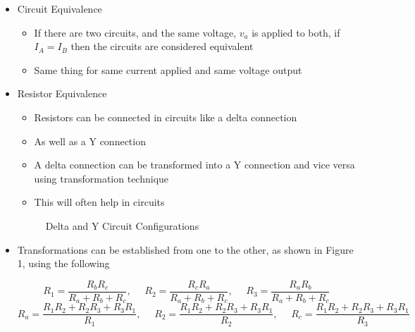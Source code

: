 \begin{itemize}

  \item Circuit Equivalence

    \begin{itemize}

      \item If there are two circuits, and the same voltage, $v_a$ is applied to both, if $I_A=I_B$ then the circuits are considered equivalent

      \item Same thing for same current applied and same voltage output

    \end{itemize}

  \item Resistor Equivalence

    \begin{itemize}

      \item Resistors can be connected in circuits like a delta connection

      \item As well as a Y connection

      \item A delta connection can be transformed into a Y connection and vice versa using transformation technique

      \item This will often help in circuits

    \end{itemize}

    \begin{figure}[h!]
      \centering
      
      \caption{Delta and Y Circuit Configurations}
      \label{fig:1}
    \end{figure}

  \item Transformations can be established from one to the other, as shown in Figure 1, using the following

    $$\boxed{R_1=\frac{R_bR_c}{R_a+R_b+R_c},\,\,\,\,\,\,\,\,R_2=\frac{R_cR_a}{R_a+R_b+R_c},\,\,\,\,\,\,\,\,R_3=\frac{R_aR_b}{R_a+R_b+R_c}}$$
    $$\boxed{R_a=\frac{R_1R_2+R_2R_3+R_3R_1}{R_1},\,\,\,\,\,\,\,\,R_2=\frac{R_1R_2+R_2R_3+R_3R_1}{R_2},\,\,\,\,\,\,\,\,R_c=\frac{R_1R_2+R_2R_3+R_3R_1}{R_3}}$$

\end{itemize}



